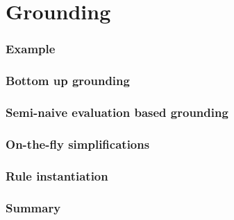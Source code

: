 \part{Grounding}


\section{Example}

\section{Bottom up grounding}

\section{Semi-naive evaluation based grounding}

\section{On-the-fly simplifications}

\section{Rule instantiation}

\section{Summary}

%
